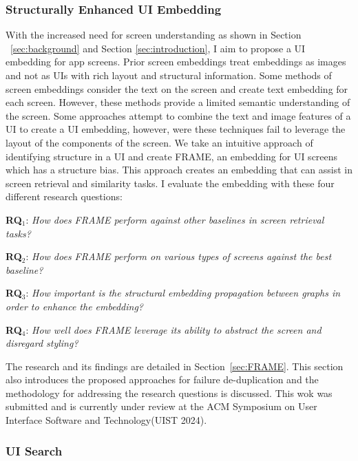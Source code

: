 \subsubsection{Structurally Enhanced UI Embedding}
With the increased need for  screen understanding as shown in Section ~\ref{sec:background} and Section \ref{sec:introduction}, I aim to propose a UI embedding for app screens. Prior screen embeddings treat embeddings as images and not as UIs with rich layout and structural information. Some methods of screen embeddings consider the text on the screen and create text embedding for each screen. However, these methods provide a limited semantic understanding of the screen. Some approaches attempt to combine the text and image features of a UI to create a UI embedding, however, were these techniques fail to leverage the layout of the components of the screen. We take an intuitive approach of identifying structure in a UI and create FRAME, an embedding for UI screens which has a structure bias. This approach creates an embedding that can assist in screen retrieval and similarity tasks. I evaluate the embedding with these four different research questions: 

\begin{description}
  
    \item \textbf{RQ$_1$}: \textit{How does FRAME perform against other baselines in screen retrieval tasks?}
    \item \textbf{RQ$_2$}: \textit{How does FRAME perform on various types of screens against the best baseline?}
    \item \textbf{RQ$_3$}: \textit{How important is the structural embedding propagation between graphs in order to enhance the embedding?}
    \item \textbf{RQ$_4$}: \textit{How well does FRAME leverage its ability to abstract the screen and disregard styling?}

 \end{description}


The research and its findings are detailed in Section~\ref{sec:FRAME}. This section also introduces the proposed approaches for failure de-duplication and the methodology for addressing the research questions is discussed. This wok was submitted and is currently under review at the ACM Symposium on User Interface Software and Technology(UIST 2024). 


\subsubsection{UI Search}

